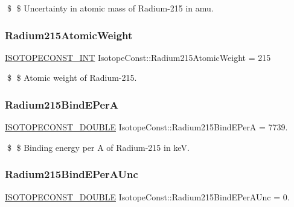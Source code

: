 \$ \$ Uncertainty in atomic mass of Radium-\/215 in amu. \mbox{\label{group___isotope_const-_radium-_ra215_ga7a604a785ca10d384570a8ea1270a8b9}} 
\subsubsection{\texorpdfstring{Radium215\+Atomic\+Weight}{Radium215AtomicWeight}}
{\footnotesize\ttfamily \mbox{\hyperlink{group___isotope_const-_macros_ga5f18360b3e99483a35c32d789e62621c}{I\+S\+O\+T\+O\+P\+E\+C\+O\+N\+S\+T\+\_\+\+I\+NT}} Isotope\+Const\+::\+Radium215\+Atomic\+Weight = 215}

\$ \$ Atomic weight of Radium-\/215. \mbox{\label{group___isotope_const-_radium-_ra215_ga20e271dc25733f79b5896498d06f1412}} 
\subsubsection{\texorpdfstring{Radium215\+Bind\+E\+PerA}{Radium215BindEPerA}}
{\footnotesize\ttfamily \mbox{\hyperlink{group___isotope_const-_macros_ga8f45a7272ce02c0b4c65c44636ed719a}{I\+S\+O\+T\+O\+P\+E\+C\+O\+N\+S\+T\+\_\+\+D\+O\+U\+B\+LE}} Isotope\+Const\+::\+Radium215\+Bind\+E\+PerA = 7739.}

\$ \$ Binding energy per A of Radium-\/215 in keV. \mbox{\label{group___isotope_const-_radium-_ra215_gaf9852218e81b99604b63817604b7bd7b}} 
\subsubsection{\texorpdfstring{Radium215\+Bind\+E\+Per\+A\+Unc}{Radium215BindEPerAUnc}}
{\footnotesize\ttfamily \mbox{\hyperlink{group___isotope_const-_macros_ga8f45a7272ce02c0b4c65c44636ed719a}{I\+S\+O\+T\+O\+P\+E\+C\+O\+N\+S\+T\+\_\+\+D\+O\+U\+B\+LE}} Isotope\+Const\+::\+Radium215\+Bind\+E\+Per\+A\+Unc = 0.}

